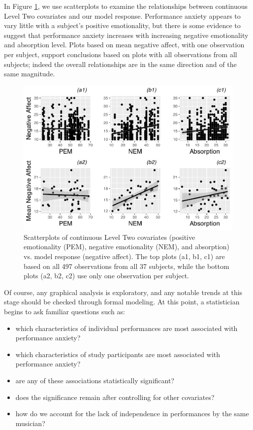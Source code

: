 \documentclass[
]{krantz}
\providecommand{\tightlist}{%
  \setlength{\itemsep}{0pt}\setlength{\parskip}{0pt}}
\begin{document}
In Figure \ref{fig:mli-scatmat1}, we use scatterplots to examine the relationships between continuous Level Two covariates and our model response. Performance anxiety appears to vary little with a subject's positive emotionality, but there is some evidence to suggest that performance anxiety increases with increasing negative emotionality and absorption level. Plots based on mean negative affect, with one observation per subject, support conclusions based on plots with all observations from all subjects; indeed the overall relationships are in the same direction and of the same magnitude.

\begin{figure}

{\centering \includegraphics[width=0.6\linewidth]{bookdown-BeyondMLR_files/figure-latex/mli-scatmat1-1} 

}

\caption{ Scatterplots of continuous Level Two covariates (positive emotionality (PEM), negative emotionality (NEM), and absorption) vs. model response (negative affect).  The top plots (a1, b1, c1) are based on all 497 observations from all 37 subjects, while the bottom plots (a2, b2, c2) use only one observation per subject.}\label{fig:mli-scatmat1}
\end{figure}

Of course, any graphical analysis is exploratory, and any notable trends at this stage should be checked through formal modeling. At this point, a statistician begins to ask familiar questions such as:

\begin{itemize}
\tightlist
\item
  which characteristics of individual performances are most associated with performance anxiety?
\item
  which characteristics of study participants are most associated with performance anxiety?
\item
  are any of these associations statistically significant?
\item
  does the significance remain after controlling for other covariates?
\item
  how do we account for the lack of independence in performances by the same musician?
\end{itemize}
\end{document}
